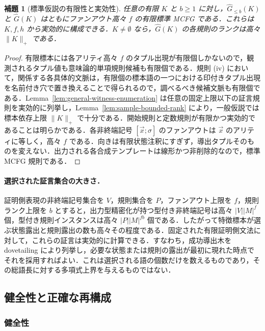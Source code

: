 \documentclass[11pt,a4paper]{ltjsarticle}
\numberwithin{equation}{section}
\theoremstyle{plain}
\newtheorem{lemma}[theorem]{補題}
\theoremstyle{definition}
\theoremstyle{remark}
\newcommand{\tuple}[1]{\vec{#1}}
\begin{document}
\begin{lemma}[標準仮説の有限性と実効性]
\label{lem:learner-effective}
任意の有限 \(K\) と \(b\ge1\) に対し，\(\widehat G_{\le b}(K)\) と \(\widehat G(K)\) はともにファンアウト高々 \(f\) の有限標準 MCFG である．これらは \(K,f,h\) から実効的に構成できる．\(K\ne\emptyset\) なら，\(\widehat G(K)\) の各規則のランクは高々 \(\|K\|_+\) である．
\end{lemma}

\begin{proof}
有限標本には各アリティ高々 \(f\) のタプル出現が有限個しかないので，観測されるタプル値も意味論的単項規則候補も有限個である．規則 (iv) において，関係する各具体的文脈は，有限個の標本語の一つにおける印付きタプル出現を名前付き穴で置き換えることで得られるので，調べるべき候補文脈も有限個である．Lemma~\ref{lem:general-witness-enumeration} は任意の固定上限以下の証言規則を実効的に列挙し，Lemma~\ref{lem:sample-bounded-rank} により，一般仮説では標本依存上限 \(\|K\|_+\) で十分である．開始規則と定数規則が有限かつ実効的であることは明らかである．各非終端記号 \([\tuple x;\sigma]\) のファンアウトは \(\tuple x\) のアリティに等しく，高々 \(f\) である．向きは有限状態注釈にすぎず，導出タプルそのものを変えない．出力される各合成テンプレートは線形かつ非削除的なので，標準 MCFG 規則である．
\end{proof}

\paragraph{選択された証言集合の大きさ．}
証明側表現の非終端記号集合を $V$，規則集合を $P$，ファンアウト上限を $f$，規則ランク上限を $b$ とすると，出力型精密化が持つ型付き非終端記号は高々 $|V||M|^f$ 個，型付き規則インスタンスは高々 $|P||M|^{fb}$ 個である．したがって特徴標本が選ぶ状態露出と規則露出の数も高々その程度である．固定された有限証明側文法に対して，これらの証言は実効的に計算できる．すなわち，成功導出木を dovetailing により列挙し，必要な状態または規則の露出が最初に現れた時点でそれを採用すればよい．これは選択される語の個数だけを数えるものであり，その総語長に対する多項式上界を与えるものではない．
\subsection{健全性と正確な再構成}
\subsubsection{健全性}
\label{sec:soundness}
\end{document}
